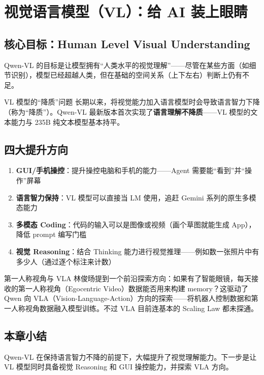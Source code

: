 \section{视觉语言模型（VL）：给 AI 装上眼睛}

\subsection{核心目标：Human Level Visual Understanding}

Qwen-VL 的目标是让模型拥有``人类水平的视觉理解''——尽管在某些方面（如细节识别），模型已经超越人类，但在基础的空间关系（上下左右）判断上仍有不足。

\begin{warningbox}{VL 模型的``降质''问题}
长期以来，将视觉能力加入语言模型时会导致语言智力下降（称为``降质''）。Qwen-VL 最新版本首次实现了\textbf{语言理解不降质}——VL 模型的文本能力与 235B 纯文本模型基本持平。
\end{warningbox}

\subsection{四大提升方向}

\begin{enumerate}
    \item \textbf{GUI/手机操控}：提升操控电脑和手机的能力——Agent 需要能``看到''并``操作''屏幕
    \item \textbf{语言智力保持}：VL 模型可以直接当 LM 使用，追赶 Gemini 系列的原生多模态能力
    \item \textbf{多模态 Coding}：代码的输入可以是图像或视频（画个草图就能生成 App），降低 prompt 编写门槛
    \item \textbf{视觉 Reasoning}：结合 Thinking 能力进行视觉推理——例如数一张照片中有多少人（通过逐个标注来计数）
\end{enumerate}

\begin{knowledgebox}{第一人称视角与 VLA}
林俊旸提到一个前沿探索方向：如果有了智能眼镜，每天接收的第一人称视角（Egocentric Video）数据能否用来构建 memory？这驱动了 Qwen 向 VLA（Vision-Language-Action）方向的探索——将机器人控制数据和第一人称视角数据融入模型训练。不过 VLA 目前连基本的 Scaling Law 都未探通。
\end{knowledgebox}

\subsection{本章小结}

Qwen-VL 在保持语言智力不降的前提下，大幅提升了视觉理解能力。下一步是让 VL 模型同时具备视觉 Reasoning 和 GUI 操控能力，并探索 VLA 方向。

